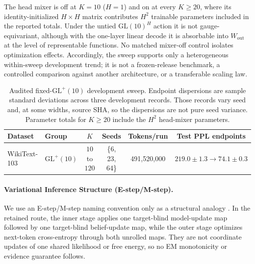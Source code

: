 \documentclass[twoside,11pt]{article}
\begin{document}
The head mixer is off at $K=10$ ($H=1$) and on at every $K\geq20$, where its identity-initialized $H\times H$ matrix contributes $H^2$ trainable parameters included in the reported totals. Under the untied $\mathrm{GL}(10)^H$ action it is not gauge-equivariant, although with the one-layer linear decode it is absorbable into $W_{\mathrm{out}}$ at the level of representable functions. No matched mixer-off control isolates optimization effects. Accordingly, the sweep supports only a heterogeneous within-sweep development trend; it is not a frozen-release benchmark, a controlled comparison against another architecture, or a transferable scaling law.

\begin{table}[t]
\centering
\small
\renewcommand{\arraystretch}{1.2}
\begin{tabular}{llcccc}
\hline
\textbf{Dataset} & \textbf{Group} & $K$ & \textbf{Seeds} & \textbf{Tokens/run} & \textbf{Test PPL endpoints} \\
\hline
WikiText-103 & $\mathrm{GL}^+(10)$ & $10$ to $120$ & \{6, 23, 64\} & 491{,}520{,}000 & $219.0\pm1.3\to74.1\pm0.3$ \\
\hline
\end{tabular}
\caption{Audited fixed-$\mathrm{GL}^+(10)$ development sweep. Endpoint dispersions are sample standard deviations across three development records. Those records vary seed and, at some widths, source SHA, so the dispersions are not pure seed variance. Parameter totals for $K\geq20$ include the $H^2$ head-mixer parameters.}
\label{tab:glk_spec}
\end{table}


\paragraph{Variational Inference Structure (E-step/M-step).}
We use an E-step/M-step naming convention only as a structural analogy \citep{Dempster1977,Neal1998}. In the retained route, the inner stage applies one target-blind model-update map followed by one target-blind belief-update map, while the outer stage optimizes next-token cross-entropy through both unrolled maps. They are not coordinate updates of one shared likelihood or free energy, so no EM monotonicity or evidence guarantee follows.
\end{document}
